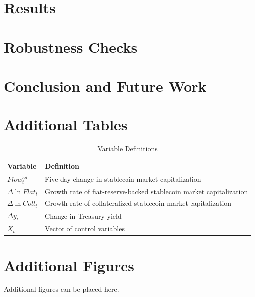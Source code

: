 \documentclass[12pt]{article}
\begin{document}
\section{Results}
\section{Robustness Checks}
\section{Conclusion and Future Work}






\newpage




\newpage

\appendix

\section{Additional Tables}

\begin{table}[H]
\centering
\caption{Variable Definitions}
\label{tab:variables}
\begin{tabular}{ll}
\toprule
Variable & Definition \\
\midrule
$Flow_t^{5d}$ & Five-day change in stablecoin market capitalization \\
$\Delta \ln Flat_t$ & Growth rate of fiat-reserve-backed stablecoin market capitalization \\
$\Delta \ln Coll_t$ & Growth rate of collateralized stablecoin market capitalization \\
$\Delta y_t$ & Change in Treasury yield \\
$X_t$ & Vector of control variables \\
\bottomrule
\end{tabular}
\end{table}

\section{Additional Figures}

Additional figures can be placed here.
\end{document}
